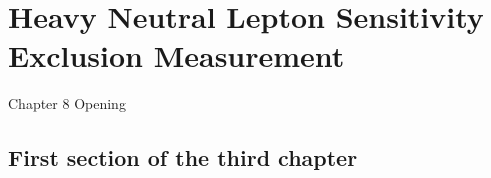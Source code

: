 \chapter{Heavy Neutral Lepton Sensitivity Exclusion Measurement}

\ifpdf
    \graphicspath{{Chapter8/Figs/Raster/}{Chapter8/Figs/PDF/}{Chapter8/Figs/}}
\else
    \graphicspath{{Chapter8/Figs/Vector/}{Chapter8/Figs/}}
\fi


Chapter 8 Opening


\section{First section of the third chapter}
